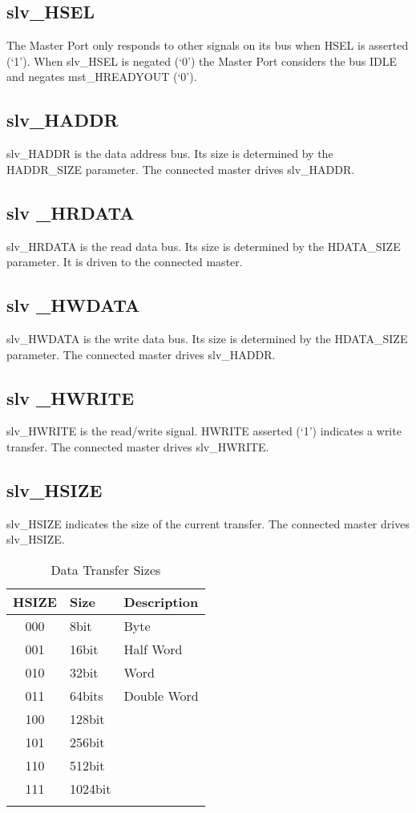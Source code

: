 \subsection{slv\_HSEL}\label{slv_hsel}

The Master Port only responds to other signals on its bus when HSEL is
asserted (`1'). When slv\_HSEL is negated (`0') the Master Port
considers the bus IDLE and negates mst\_HREADYOUT (`0').

\subsection{slv\_HADDR}\label{slv_haddr}

slv\_HADDR is the data address bus. Its size is determined by the
HADDR\_SIZE parameter. The connected master drives slv\_HADDR.

\subsection{slv \_HRDATA}\label{slv-_hrdata}

slv\_HRDATA is the read data bus. Its size is determined by the
HDATA\_SIZE parameter. It is driven to the connected master.

\subsection{slv \_HWDATA}\label{slv-_hwdata}

slv\_HWDATA is the write data bus. Its size is determined by the
HDATA\_SIZE parameter. The connected master drives slv\_HADDR.

\subsection{slv \_HWRITE}\label{slv-_hwrite}

slv\_HWRITE is the read/write signal. HWRITE asserted (`1') indicates a
write transfer. The connected master drives slv\_HWRITE.

\subsection{slv\_HSIZE}\label{slv_hsize}

slv\_HSIZE indicates the size of the current transfer. The connected
master drives slv\_HSIZE.

\begin{longtable}[]{@{}cll@{}}
\toprule
HSIZE & Size & Description\tabularnewline
\midrule
\endhead
000 & 8bit & Byte\tabularnewline
001 & 16bit & Half Word\tabularnewline
010 & 32bit & Word\tabularnewline
011 & 64bits & Double Word\tabularnewline
100 & 128bit &\tabularnewline
101 & 256bit &\tabularnewline
110 & 512bit &\tabularnewline
111 & 1024bit &\tabularnewline
\bottomrule
\caption{Data Transfer Sizes}
\end{longtable}

